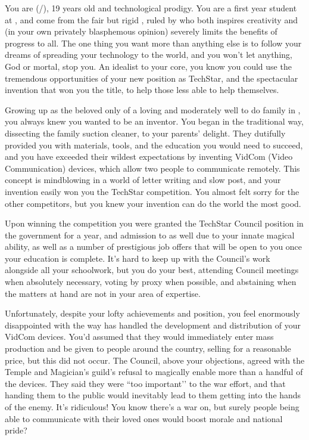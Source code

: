 \documentclass[char]{GL2020}
\begin{document}
\name{\cTechStar{}}


You are \cTechStar{} (\cTechStar{\they}/\cTechStar{\them}), 19 years old and technological prodigy.  You are a first year student at \pSchool{}, and come from the fair but rigid \pTech{}, ruled by \cTechGod{} who both inspires creativity and (in your own privately blasphemous opinion) severely limits the benefits of progress to all. The one thing you want more than anything else is to follow your dreams of spreading your technology to the world, and you won’t let anything, God or mortal, stop you.  An idealist to your core, you know you could use the tremendous opportunities of your new position as TechStar, and the spectacular invention that won you the title, to help those less able to help themselves.

Growing up as the beloved only \cTechStar{\child} of a loving and moderately well to do family in \pTech{}, you always knew you wanted to be an inventor.  You began in the traditional way, dissecting the family suction cleaner, to your parents’ delight.  They dutifully provided you with materials, tools, and the education you would need to succeed, and you have exceeded their wildest expectations by inventing VidCom (Video Communication) devices, which allow two people to communicate remotely.  This concept is mindblowing in a world of letter writing and slow post, and your invention easily won you the TechStar competition. You almost felt sorry for the other competitors, but you knew your invention can do the world the most good.  

Upon winning the competition you were granted the TechStar Council position in the government for a year, and admission to \pSchool{} as well due to your innate magical ability, as well as a number of prestigious job offers that will be open to you once your education is complete. It’s hard to keep up with the Council’s work alongside all your schoolwork, but you do your best, attending Council meetings when absolutely necessary, voting by proxy when possible, and abstaining when the matters at hand are not in your area of expertise.  

Unfortunately, despite your lofty achievements and position, you feel enormously disappointed with the way \pTech{} has handled the development and distribution of your VidCom devices.  You’d assumed that they would immediately enter mass production and be given to people around the country, selling for a reasonable price, but this did not occur. The Council, above your objections, agreed with the Temple and Magician’s guild’s refusal to magically enable more than a handful of the devices. They said they were ``too important’’ to the war effort, and that handing them to the public would inevitably lead to them getting into the hands of the enemy.  It’s ridiculous!  You know there’s a war on, but surely people being able to communicate with their loved ones would boost morale and national pride?
\end{document}
